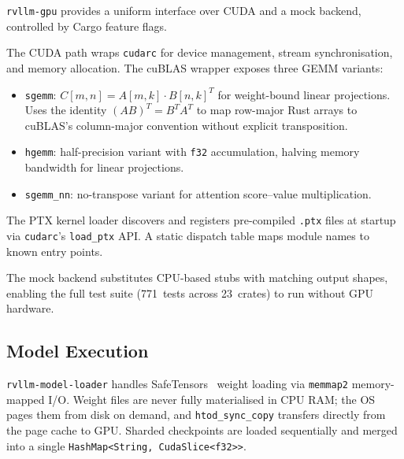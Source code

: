 \documentclass[11pt,a4paper]{article}
\begin{document}
\texttt{rvllm-gpu} provides a uniform interface over CUDA and a mock backend,
controlled by Cargo feature flags.

The CUDA path wraps \texttt{cudarc} for device management, stream synchronisation,
and memory allocation. The cuBLAS wrapper exposes three GEMM variants:

\begin{itemize}
  \item \texttt{sgemm}: $C[m,n] = A[m,k] \cdot B[n,k]^T$ for weight-bound linear
        projections. Uses the identity $(AB)^T = B^T A^T$ to map row-major Rust arrays
        to cuBLAS's column-major convention without explicit transposition.
  \item \texttt{hgemm}: half-precision variant with \texttt{f32} accumulation, halving
        memory bandwidth for linear projections.
  \item \texttt{sgemm\_nn}: no-transpose variant for attention score--value
        multiplication.
\end{itemize}

The PTX kernel loader discovers and registers pre-compiled \texttt{.ptx} files at
startup via \texttt{cudarc}'s \texttt{load\_ptx} API. A static dispatch table maps
module names to known entry points.

The mock backend substitutes CPU-based stubs with matching output shapes, enabling
the full test suite (771~tests across 23~crates) to run without GPU hardware.

\subsection{Model Execution}

\texttt{rvllm-model-loader} handles SafeTensors~\cite{safetensors2023} weight loading
via \texttt{memmap2} memory-mapped I/O. Weight files are never fully materialised in
CPU RAM; the OS pages them from disk on demand, and \texttt{htod\_sync\_copy}
transfers directly from the page cache to GPU. Sharded checkpoints are loaded
sequentially and merged into a single \texttt{HashMap<String, CudaSlice<f32>{}>}.
\end{document}
